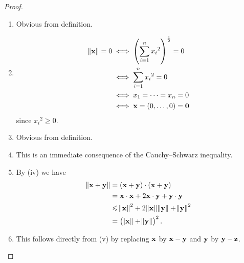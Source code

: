 \begin{proof} \
\begin{enumerate}[label=(\roman*)]
\item Obvious from definition.
\item \begin{align*}
\norm{\vb{x}}=0&\iff\left(\sum_{i=1}^n{x_i}^2\right)^\frac{1}{2}=0\\
&\iff\sum_{i=1}^n{x_i}^2=0\\
&\iff x_1=\cdots=x_n=0\\
&\iff\vb{x}=(0,\dots,0)=\vb{0}
\end{align*}
since ${x_i}^2\ge0$.

\item Obvious from definition.
\item This is an immediate consequence of the Cauchy--Schwarz inequality.
\item By (iv) we have
\begin{align*}
\norm{\vb{x}+\vb{y}}&=(\vb{x}+\vb{y})\cdot(\vb{x}+\vb{y})\\
&=\vb{x}\cdot\vb{x}+2\vb{x}\cdot\vb{y}+\vb{y}\cdot\vb{y}\\
&\leqslant\norm{\vb{x}}^2+2\norm{\vb{x}}\norm{\vb{y}}+\norm{\vb{y}}^2\\
&=\left(\norm{\vb{x}}+\norm{\vb{y}}\right)^2.
\end{align*}
\item This follows directly from (v) by replacing $\vb{x}$ by $\vb{x}-\vb{y}$ and $\vb{y}$ by $\vb{y}-\vb{z}$.
\end{enumerate}
\end{proof}

\begin{comment}
\begin{definition}
The \vocab{distance between sets} $E\subset\RR^n$ and $F\subset\RR^n$ is defined as
\[ d(E,F)\coloneqq\inf_{x\in E,y\in F}\norm{x-y}. \]
\end{definition}

Obviously $d(E,F)>0$ implies that $E$ and $F$ are disjoint, but $E$ and $F$ may still be disjoint even if $d(E,F)=0$. For example, the closed intervals $E=(-1,0)$ and $F=(0,1)$.

\begin{exercise}
Suppose that $E$ and $F$ are sets in $\RR^n$ where $E$ and $F$ is finite. Prove that $E$ and $F$ are disjoint if and only if $d(E,F)>0$.
\end{exercise}
\end{comment}
\pagebreak

